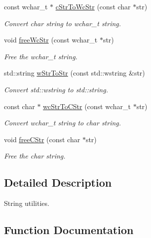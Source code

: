 \begin{DoxyCompactItemize}
const wchar\+\_\+t $\ast$ \hyperlink{namespacelakoo_1_1_string_utils_aea1ebb73b8aa4f817d1473900cf16c29}{c\+Str\+To\+Wc\+Str} (const char $\ast$str)
\begin{DoxyCompactList}\small\item\em Convert char string to wchar\+\_\+t string. \end{DoxyCompactList}\item 
void \hyperlink{namespacelakoo_1_1_string_utils_a84da50c47fed24d0b4a467b84c5e2c7d}{free\+Wc\+Str} (const wchar\+\_\+t $\ast$str)
\begin{DoxyCompactList}\small\item\em Free the wchar\+\_\+t string. \end{DoxyCompactList}\item 
std\+::string \hyperlink{namespacelakoo_1_1_string_utils_ac5f5ff19cad730bfb33924cd6cd8da15}{w\+Str\+To\+Str} (const std\+::wstring \&str)
\begin{DoxyCompactList}\small\item\em Convert std\+::wstring to std\+::string. \end{DoxyCompactList}\item 
const char $\ast$ \hyperlink{namespacelakoo_1_1_string_utils_a13b1c55460bae1b1ebbab0164ebe722b}{wc\+Str\+To\+C\+Str} (const wchar\+\_\+t $\ast$str)
\begin{DoxyCompactList}\small\item\em Convert wchar\+\_\+t string to char string. \end{DoxyCompactList}\item 
void \hyperlink{namespacelakoo_1_1_string_utils_aba915091fd9f6cc45a2720c936e3a680}{free\+C\+Str} (const char $\ast$str)
\begin{DoxyCompactList}\small\item\em Free the char string. \end{DoxyCompactList}\end{DoxyCompactItemize}


\subsection{Detailed Description}
String utilities. 

\subsection{Function Documentation}
\mbox{\label{namespacelakoo_1_1_string_utils_ad236af80219ed789fd57d59cc2a380e7}} 
